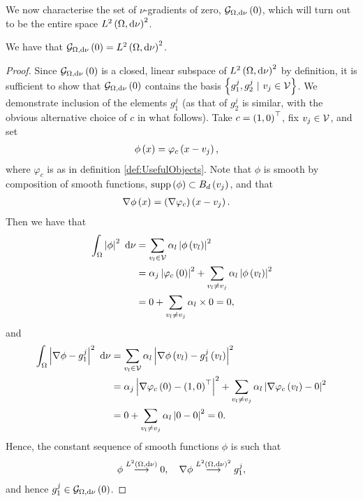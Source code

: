 We now characterise the set of $\nu$-gradients of zero, $\mathcal{G}_{ \Omega, \mathrm{d}\nu}\left( 0 \right)$, which will turn out to be the entire space $L^{2}\left( \Omega,\mathrm{d}\nu \right)^2$.
\begin{prop} \label{prop:CharPointMassGradZero}
	We have that $\mathcal{G}_{ \Omega, \mathrm{d}\nu}\left( 0 \right) = L^{2}\left( \Omega,\mathrm{d}\nu \right)^2$.
\end{prop}
\begin{proof}
	Since $\mathcal{G}_{ \Omega, \mathrm{d}\nu}\left( 0 \right)$ is a closed, linear subspace of $L^{2}\left( \Omega,\mathrm{d}\nu \right)^2$ by definition, it is sufficient to show that $\mathcal{G}_{ \Omega, \mathrm{d}\nu}\left( 0 \right)$ contains the basis $\clbracs{g_1^j, g_2^j \ \vert \ v_j\in\vertSet}$.
	We demonstrate inclusion of the elements $g^j_1$ (as that of $g^j_2$ is similar, with the obvious alternative choice of $c$ in what follows).
	Take $c=\left( 1,0 \right)^{\top}$, fix $v_j\in\mathcal{V}$, and set
	\begin{align*}
		\phi\left( x \right) &= \varphi_c\left( x-v_j \right),
	\end{align*}
	where $\varphi_c$ is as in definition \ref{def:UsefulObjects}.
	Note that $\phi$ is smooth by composition of smooth functions, $\mathrm{supp}\left( \phi \right)\subset B_{d}\left( v_j \right)$, and that
	\begin{align*}
		\nabla\phi\left( x \right) &= \left( \nabla\varphi_c \right)\left( x-v_j \right).
	\end{align*}
	Then we have that
	\begin{align*}
		\int_{\Omega}\left\lvert \phi \right\rvert^2 \ \mathrm{d}\nu &= \sum_{v_l\in\mathcal{V}} \alpha_l\left\lvert \phi\left( v_l \right) \right\rvert^2 \\
		&= \alpha_j\left\lvert \varphi_c\left( 0 \right) \right\rvert^2 + \sum_{v_l\neq v_j}\alpha_l\left\lvert \phi\left( v_l \right) \right\rvert^2 \\
		&= 0 + \sum_{v_l\neq v_j} \alpha_l \times 0 = 0,
	\end{align*}
	and
	\begin{align*}
		\int_{\Omega}\left\lvert \nabla\phi - g^j_1 \right\rvert^2 \ \mathrm{d}\nu &= \sum_{v_l\in\mathcal{V}} \alpha_l\left\lvert \nabla\phi\left( v_l \right) - g^j_1\left( v_l \right) \right\rvert^2 \\
		&= \alpha_j\left\lvert \nabla\varphi_c\left( 0 \right) - \left( 1,0 \right)^{\top} \right\rvert^2 + \sum_{v_l\neq v_j} \alpha_l\left\lvert \nabla\varphi_c\left( v_l \right) - 0 \right\rvert^2 \\
		&= 0 + \sum_{v_l\neq v_j} \alpha_l\left\lvert 0 - 0 \right\rvert^2 = 0.
	\end{align*}
	Hence, the constant sequence of smooth functions $\phi$ is such that
	\begin{align*}
		\phi\overset{L^{2}\left( \Omega,\mathrm{d}\nu \right)}{\longrightarrow}0, \quad \nabla\phi\overset{L^{2}\left( \Omega,\mathrm{d}\nu \right)^2}{\longrightarrow} g^j_1,
	\end{align*}
	and hence $g^j_1\in\mathcal{G}_{ \Omega, \mathrm{d}\nu}\left( 0 \right)$.
\end{proof}

